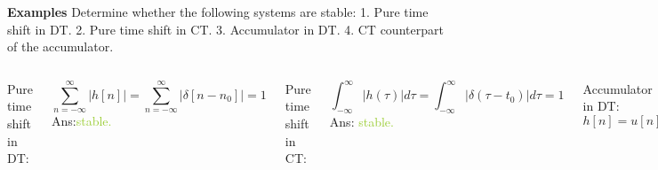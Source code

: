 \begin{frame}{}
    \noindent\textbf{Examples} Determine whether the following systems are stable: 1. Pure time shift in DT. 2. Pure time shift in CT. 3. Accumulator in DT. 4. CT counterpart of the accumulator.

    {
        \begin{columns}[totalwidth=\textwidth]
            Pure time shift in DT:\par
            \begin{equation*}
                \sum_{n=-\infty}^{\infty}|h[n]| = \sum_{n=-\infty}^{\infty}|\delta[n-n_0]| = 1
            \end{equation*}
            \pause
            Ans:\textcolor{YellowGreen}{stable.}\par
            \pause
            Pure time shift in CT:\par
            \begin{equation*}
                \int_{-\infty}^{\infty}|h(\tau)|d\tau = \int_{-\infty}^{\infty}|\delta(\tau- t_0)|d\tau = 1
            \end{equation*}
            \pause
            Ans: \textcolor{YellowGreen}{stable.}\par
            Accumulator in DT: $h[n] = u[n]$\par
            \begin{equation*}
                \sum_{n=-\infty}^{\infty}|u[n]| = \sum_{n=0}^{\infty}|u[n]| = \infty
            \end{equation*}
            \pause
            Ans: \textcolor{Tomato}{unstable.}
            \pause

            CT counterpart of the accumulator:
            \begin{equation*}
                y(t) = \int_{-\infty}^{t}x(\tau)d\tau
            \end{equation*}
            The impulse response of the integrator can be found by letting $x(t) = \delta(t)$:
            \begin{equation*}
                h(t) = \int_{-\infty}^{t}\delta(\tau)d\tau = u(t).
            \end{equation*}
            \begin{equation*}
                \int_{-\infty}^{\infty}|u(\tau)|d\tau = \int_{0}^{\infty}d\tau = \infty
            \end{equation*}
            \pause
            Ans: \textcolor{Tomato}{unstable.}
        \end{columns}
    }
\end{frame}




